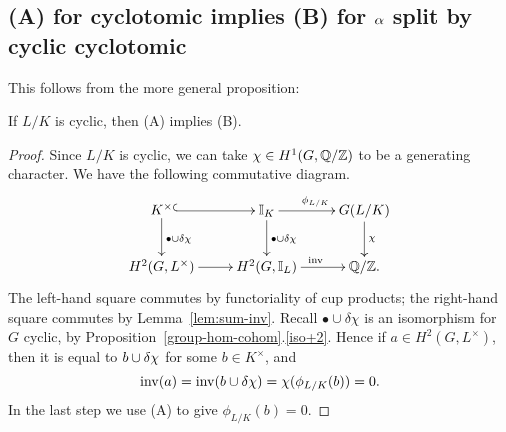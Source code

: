 \subsection{(A) for cyclotomic implies (B) for $\alpha$ split by cyclic cyclotomic}
This follows from the more general proposition:
\begin{pr}
If $L/K$ is cyclic, then (A) implies (B).
\end{pr}
\begin{proof}
Since $L/K$ is cyclic, we can take $\chi\in H^1(G,\mathbb{Q}/\mathbb{Z})$ to be a generating character. 
We have the following commutative diagram.
\[
\xymatrix{
K^{\times} \ar@{^(->}[r] \ar[d]^{\bullet\cup \de \chi} & \I_K \ar[r]^{\phi_{L/K}}\ar[d]^{\bullet\cup \de\chi} & G(L/K)\ar[d]^{\chi}\\
H^2(G,L^{\times}) \ar[r] & H^2(G,\I_L)\ar[r]^{\inv} & \Q/\Z.
}
\]
The left-hand square commutes by functoriality of cup products; the right-hand square commutes by Lemma~\ref{lem:sum-inv}. 
Recall $\bullet\cup \delta \chi$ is an isomorphism for $G$ cyclic, by Proposition~\ref{group-hom-cohom}.\ref{iso+2}. 
Hence if $a\in H^2(G,L^{\times})$, then it is equal to $b\cup \delta\chi$ for some $b\in K^{\times}$, and
\[
\operatorname{inv}(a)=\operatorname{inv}(b\cup \delta \chi)=\chi(\phi_{L/K}(b))=0.
\]
In the last step we use (A) to give $\phi_{L/K}(b)=0$.
\end{proof}
